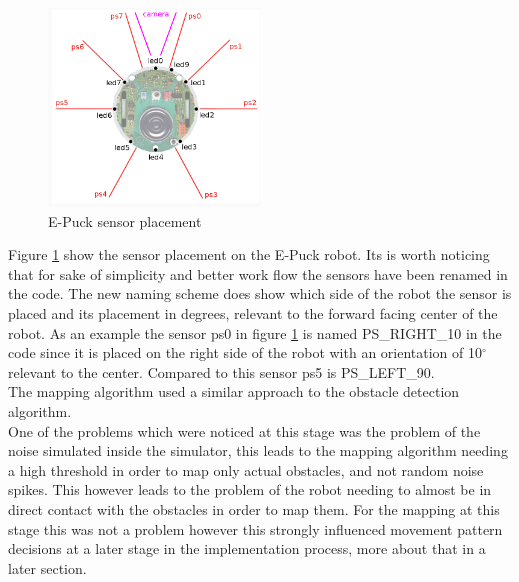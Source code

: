 \begin{figure}[h]
\centering
\includegraphics[width = 0.5\textwidth]{../../figures/e_puck_sensor_placement.png} 
\caption[E-Puck sensor placement]{E-Puck sensor placement\footnotemark}
\label{sensor_placement}
\end{figure}

Figure  \ref{sensor_placement} show the sensor placement on the E-Puck robot. Its is worth noticing that for sake of simplicity and better work flow the sensors have been renamed in the code. The new naming scheme does show which side of the robot the sensor is placed and its placement in degrees, relevant to the forward facing center of the robot. As an example the sensor ps0 in figure \ref{sensor_placement} is named PS\_RIGHT\_10 in the code since it is placed on the right side of the robot with an orientation of 10$^{\circ}$ relevant to the center.
Compared to this sensor ps5 is PS\_LEFT\_90.   \\[3ex]

The mapping algorithm used a similar approach to the obstacle detection algorithm. \\
One of the problems which were noticed at this stage was the problem of the noise simulated inside the simulator, this leads to the mapping algorithm needing a high threshold in order to map only actual obstacles, and not random noise spikes.  This however leads to the problem of the robot needing to almost be in direct contact with the obstacles in order to map them. For the mapping at this stage this was not a problem however this strongly influenced movement pattern decisions at a later stage in the implementation process, more about that in a later section.

